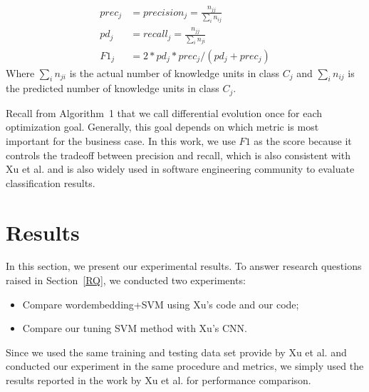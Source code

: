 \documentclass[sigconf,review, anonymous]{acmart}
\theoremstyle{break}
\newcommand{\bi}{\begin{itemize}[leftmargin=0.4cm]}
\newcommand{\ei}{\end{itemize}}
\begin{document}
{\[
\begin{array}{ll}
prec_j &= precision_j = \frac{n_{jj}}{\sum_{i}n_{ij}}\\
pd_j &= recall_j = \frac{n_{jj}}{\sum_{i}n_{ji}}\\ 
F1_{j} &= 2*pd_j*prec_j/(pd_j + prec_j)
\end{array}
\]}
Where ${\sum_{i}n_{ji}}$ is the actual number of knowledge units in class $C_j$
and $\sum_{i}n_{ij}$ is the predicted number of knowledge units in class $C_j$.


Recall from Algorithm~1 that we call differential evolution once for each
optimization goal. Generally, this goal depends on which metric is most important for
the business case. In this work, we use $F1$ as the score because it controls
the tradeoff between precision and recall, which is also consistent with Xu et al.\cite{xu2016predicting}
and is also widely used in software engineering
community to evaluate classification results\cite{wang2016automatically,menzies2007data,fu2016tuning,kim2008classifying}.


\section{Results}
In this section, we present our experimental results. To answer research questions raised in
Section~\ref{RQ}, we conducted two experiments:
\bi
\item
Compare   wordembedding+SVM using Xu's code and our code;
\item
Compare our tuning SVM method with Xu's CNN.
\ei
Since we used the same training and testing data set provide by Xu
et al.\cite{xu2016predicting} and conducted our experiment in the same procedure and metrics, we simply used the results reported in the work by Xu et al.\cite{xu2016predicting} for performance comparison. 
\end{document}
